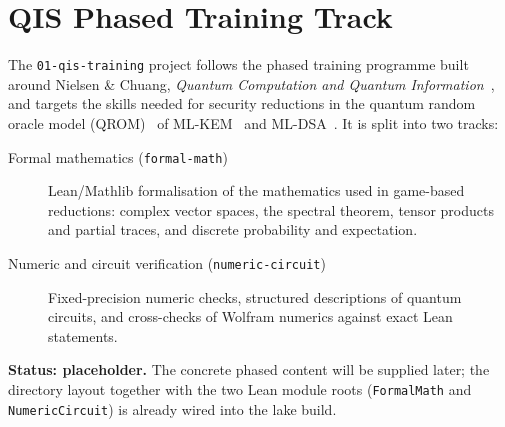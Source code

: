 \section{QIS Phased Training Track}\label{sec:qis-training}

The \texttt{01-qis-training} project follows the phased training programme
built around Nielsen \& Chuang, \emph{Quantum Computation and Quantum
Information}~\cite{NielsenChuang2010}, and targets the skills needed for
security reductions in the quantum random oracle model
(QROM)~\cite{BDFLSZ2011QROM} of ML-KEM~\cite{FIPS203} and
ML-DSA~\cite{FIPS204}. It is split into two tracks:

\begin{description}
  \item[Formal mathematics (\texttt{formal-math})] Lean/Mathlib
        formalisation of the mathematics used in game-based reductions:
        complex vector spaces, the spectral theorem, tensor products and
        partial traces, and discrete probability and expectation.
  \item[Numeric and circuit verification (\texttt{numeric-circuit})]
        Fixed-precision numeric checks, structured descriptions of
        quantum circuits, and cross-checks of Wolfram numerics against
        exact Lean statements.
\end{description}

\noindent\textbf{Status: placeholder.} The concrete phased content will be
supplied later; the directory layout together with the two Lean module roots
(\texttt{FormalMath} and \texttt{NumericCircuit}) is already wired into the
lake build.
